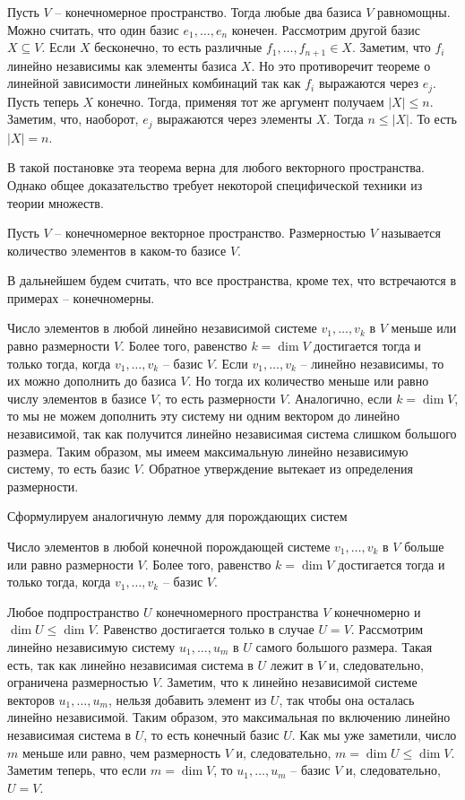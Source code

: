  Пусть $V$ -- конечномерное пространство. Тогда любые два базиса $V$  равномощны.
\proof Можно считать, что один базис $e_1,\dots,e_n$ конечен. Рассмотрим другой базис $X \subseteq V$. Если $X$ бесконечно, то есть различные $f_1,\dots,f_{n+1}\in X$. Заметим, что $f_i$ линейно независимы как элементы базиса $X$. Но это противоречит  теореме о линейной зависимости линейных комбинаций так как $f_i$  выражаются через $e_j$. Пусть теперь $X$ конечно. Тогда, применяя тот же аргумент получаем $|X|\leq n$. Заметим, что, наоборот,  $e_j$ выражаются через элементы $X$. Тогда $n\leq |X|$. То есть $|X|=n$.
\endproof
\ethrm

\rm В такой постановке эта теорема верна для любого векторного пространства. Однако общее доказательство требует некоторой специфической техники из теории множеств.
\erm



\dfn[Размерность] Пусть $V$ -- конечномерное векторное пространство. Размерностью $V$ называется количество элементов в каком-то базисе $V$.
\edfn

\rm В дальнейшем будем считать, что все пространства, кроме тех, что встречаются в примерах -- конечномерны.
\erm

\lm Число элементов в любой линейно независимой системе $v_1,\dots,v_k$ в $V$ меньше или равно размерности $V$. Более того, равенство $k=\dim V$ достигается тогда и только тогда, когда $v_1,\dots,v_k$ -- базис $V$.
\elm
\proof Если $v_1,\dots,v_k$ -- линейно независимы, то их можно дополнить до базиса $V$. Но тогда их количество меньше или равно числу элементов в базисе $V$, то есть размерности $V$.
Аналогично, если $k=\dim V$, то мы не можем дополнить эту систему ни одним вектором до линейно независимой, так как получится линейно независимая система слишком большого размера. Таким образом, мы имеем максимальную линейно независимую систему, то есть базис $V$. Обратное утверждение вытекает из определения размерности.
\endproof

Сформулируем аналогичную лемму для порождающих систем

\lm Число элементов в любой конечной порождающей системе $v_1,\dots,v_k$ в $V$ больше или равно размерности $V$. Более того, равенство $k=\dim V$ достигается тогда и только тогда, когда $v_1,\dots,v_k$ -- базис $V$.
\elm



\thrm Любое подпространство $U$ конечномерного пространства $V$ конечномерно и $\dim U \leq \dim V$. Равенство достигается только в случае $U=V$.
\ethrm
\proof Рассмотрим линейно независимую систему $u_1,\dots,u_m$ в $U$ самого большого размера. Такая есть, так как линейно независимая система в $U$ лежит в $V$ и, следовательно, ограничена размерностью $V$. Заметим, что к линейно независимой системе векторов $ u_1,\dots,u_m $, нельзя добавить элемент из $U$, так чтобы она осталась линейно независимой. Таким образом, это максимальная по включению линейно независимая система в $U$, то есть конечный базис $U$. Как мы уже заметили, число $m$ меньше или равно, чем размерность $V$ и, следовательно, $m=\dim U \leq \dim V$. Заметим теперь, что если $m=\dim V$, то $u_1,\dots,u_m$ -- базис $V$ и, следовательно, $U=V$.
\endproof



